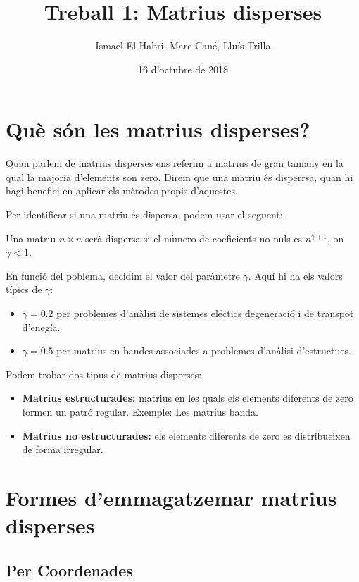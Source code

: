 \documentclass[11pt,a4paper,twoside]{report}
\begin{document}
  
  \title{Treball 1: Matrius disperses}
  \author{Ismael El Habri, Marc Cané, Lluís Trilla}
  \date{16 d'octubre de 2018}
  \maketitle
  
  \tableofcontents
  
  
  \chapter{Què són les matrius disperses?}
  
  Quan parlem de matrius disperses ens referim a matrius de gran tamany en la qual la majoria d'elements son zero. Direm que 
  una matriu és disperrsa, quan hi hagi benefici en aplicar els mètodes propis d'aquestes. 
  
  Per identificar si una matriu és dispersa, podem usar el seguent:
    
  \qquad Una matriu $n \times n$ serà dispersa si el número de coeficients no nuls es $n^{\gamma+1}$, on $\gamma < 1$.

  En funció del poblema, decidim el valor del paràmetre $\gamma$. Aquí hi ha els valors típics de $\gamma$:
  \begin{itemize}
    \item $\gamma=0.2$ per problemes d'anàlisi de sistemes eléctics degeneració i de transpot d'enegía.
    \item $\gamma=0.5$ per matrius en bandes associades a problemes d'anàlisi d'estructues.
  \end {itemize}



  Podem trobar dos tipus de matrius disperses:
  \begin{itemize}
    \item \textbf{Matrius estructurades:} matrius en les quals els elements diferents de zero formen un patró regular. Exemple: Les matrius banda.
    \item \textbf{Matrius no estructurades:} els elements diferents de zero es distribueixen de forma irregular.
  \end{itemize}

  \chapter{Formes d'emmagatzemar matrius disperses}
  
  \section{Per Coordenades}
  
\end{document}
